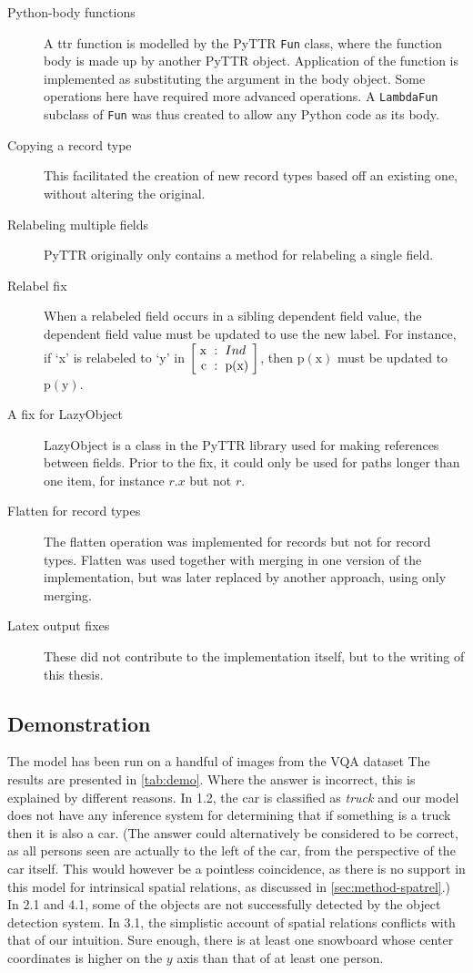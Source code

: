 \begin{description}
\item[Python-body functions] A \gls{ttr} function is modelled by the PyTTR \texttt{Fun} class, where the function body is made up by another PyTTR object. Application of the function is implemented as substituting the argument in the body object. Some operations here have required more advanced operations. A \texttt{LambdaFun} subclass of \texttt{Fun} was thus created to allow any Python code as its body.
\item[Copying a record type] This facilitated the creation of new record types based off an existing one, without altering the original.
\item[Relabeling multiple fields] PyTTR originally only contains a method for relabeling a single field.
\item[Relabel fix] When a relabeled field occurs in a sibling dependent field value, the dependent field value must be updated to use the new label. For instance, if `x' is relabeled to `y' in $\rec{\text{x} &:& Ind \\ \text{c} &:& \text{p}(\text{x})}$, then $\text{p}(\text{x})$ must be updated to $\text{p}(\text{y})$.
\item[A fix for LazyObject] LazyObject is a class in the PyTTR library used for making references between fields. Prior to the fix, it could only be used for paths longer than one item, for instance $r.x$ but not $r$.
\item[Flatten for record types] The flatten operation was implemented for records but not for record types. Flatten was used together with merging in one version of the implementation, but was later replaced by another approach, using only merging.
\item[Latex output fixes] These did not contribute to the implementation itself, but to the writing of this thesis.
\end{description}



\subsection{Demonstration}

The model has been run on a handful of images from the VQA dataset \citep{AgrawalVQAVisualQuestion2015}
The results are presented in \autoref{tab:demo}.
Where the answer is incorrect, this is explained by different reasons.
In 1.2, the car is classified as \textit{truck} and our model does not have any inference system for determining that if something is a truck then it is also a car.
(The answer could alternatively be considered to be correct, as all persons seen are actually to the left of the car, from the perspective of the car itself. This would however be a pointless coincidence, as there is no support in this model for intrinsical spatial relations, as discussed in \autoref{sec:method-spatrel}.)
In 2.1 and 4.1, some of the objects are not successfully detected by the object detection system.
In 3.1, the simplistic account of spatial relations conflicts with that of our intuition.
Sure enough, there is at least one snowboard whose center coordinates is higher on the $y$ axis than that of at least one person.

